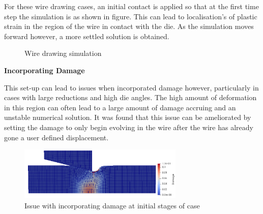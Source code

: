 For these wire drawing cases, an initial contact is applied so that at the first time step the simulation is as shown in figure. This can lead to localisation's of plastic strain in the region of the wire in contact with the die. As the simulation moves forward however, a more settled solution is obtained. 


\begin{figure}[t!]
	\centering
	  \qquad
        \qquad
		
		\caption{Wire drawing simulation}
	\label{label_for_entire_figure}
\end{figure}
\FloatBarrier

\textbf{Incorporating Damage}

This set-up can lead to issues when incorporated damage however, particularly in cases with large reductions and high die angles. The high amount of deformation in this region can often lead to a large amount of damage accruing and an unstable numerical solution. It was found that this issue can be ameliorated by setting the damage to only begin evolving in the wire after the wire has already gone a user defined displacement.

\begin{figure}[htb]
\begin{center}
	\includegraphics[width=0.7\textwidth]{./Figures/SimulationAndAnalysis/issueWithDamage.png}
\caption{Issue with incorporating damage at initial stages of case}
\label{fig:notchedRoundBAr}
\end{center}
\end{figure}